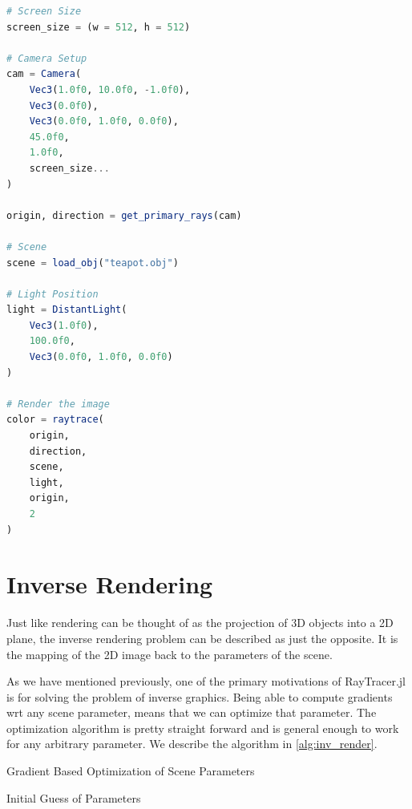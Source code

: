 \documentclass{juliacon}
\begin{document}
\noindent
\begin{minipage}{\linewidth}
\begin{lstlisting}[caption = {Rendering the Utah Teapot Model},
                   label = {lst:example_render},
                   captionpos = b,
                   language = Julia]
# Screen Size
screen_size = (w = 512, h = 512)
    
# Camera Setup
cam = Camera(
    Vec3(1.0f0, 10.0f0, -1.0f0),
    Vec3(0.0f0),
    Vec3(0.0f0, 1.0f0, 0.0f0),
    45.0f0,
    1.0f0,
    screen_size...
)
                 
origin, direction = get_primary_rays(cam)
    
# Scene
scene = load_obj("teapot.obj")
    
# Light Position
light = DistantLight(
    Vec3(1.0f0),
    100.0f0,
    Vec3(0.0f0, 1.0f0, 0.0f0)
)
                         
# Render the image
color = raytrace(
    origin,
    direction,
    scene,
    light,
    origin,
    2
)
\end{lstlisting}
\end{minipage}

\section{Inverse Rendering}


Just like rendering can be thought of as the projection of 3D objects into a 2D plane, the inverse rendering problem can be described as just the opposite. It is the mapping of the 2D image back to the parameters of the scene.

As we have mentioned previously, one of the primary motivations of RayTracer.jl is for solving the problem of inverse graphics. Being able to compute gradients wrt any scene parameter, means that we can optimize that parameter. The optimization algorithm is pretty straight forward and is general enough to work for any arbitrary parameter. We describe the algorithm in \ref{alg:inv_render}.

\begin{algorithm}[!htb]
    \caption{Gradient Based Optimization of Scene Parameters}
    \label{alg:inv_render}
    \SetAlgoLined
    Initial Guess of Parameters\;
\end{algorithm}
\end{document}
